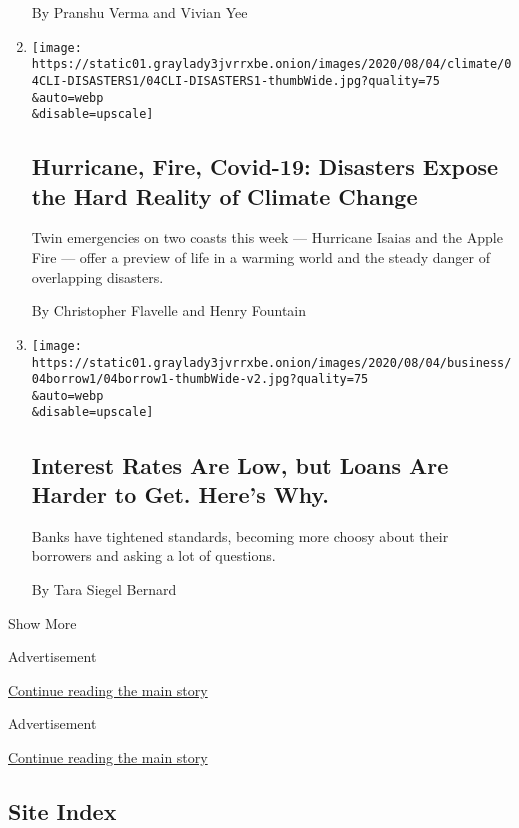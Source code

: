 \begin{enumerate}
  By Pranshu Verma and Vivian Yee
\item
  \href{/2020/08/04/climate/hurricane-isaias-apple-fire-climate.html}{}

  \texttt{[image: https://static01.graylady3jvrrxbe.onion/images/2020/08/04/climate/04CLI-DISASTERS1/04CLI-DISASTERS1-thumbWide.jpg?quality=75\\\&auto=webp\\\&disable=upscale]}

  \hypertarget{hurricane-fire-covid-19-disasters-expose-the-hard-reality-of-climate-change}{%
  \subsection{Hurricane, Fire, Covid-19: Disasters Expose the Hard
  Reality of Climate
  Change}\label{hurricane-fire-covid-19-disasters-expose-the-hard-reality-of-climate-change}}

  Twin emergencies on two coasts this week --- Hurricane Isaias and the
  Apple Fire --- offer a preview of life in a warming world and the
  steady danger of overlapping disasters.

  By Christopher Flavelle and Henry Fountain
\item
  \href{/2020/08/04/your-money/mortgage-loans-credit-cards-coronavirus.html}{}

  \texttt{[image: https://static01.graylady3jvrrxbe.onion/images/2020/08/04/business/04borrow1/04borrow1-thumbWide-v2.jpg?quality=75\\\&auto=webp\\\&disable=upscale]}

  \hypertarget{interest-rates-are-low-but-loans-are-harder-to-get-heres-why}{%
  \subsection{Interest Rates Are Low, but Loans Are Harder to Get.
  Here's
  Why.}\label{interest-rates-are-low-but-loans-are-harder-to-get-heres-why}}

  Banks have tightened standards, becoming more choosy about their
  borrowers and asking a lot of questions.

  By Tara Siegel Bernard
\end{enumerate}

Show More

Advertisement

\protect\hyperlink{after-mid1}{Continue reading the main story}

Advertisement

\protect\hyperlink{after-mktg}{Continue reading the main story}

\hypertarget{site-index}{%
\subsection{Site Index}\label{site-index}}

